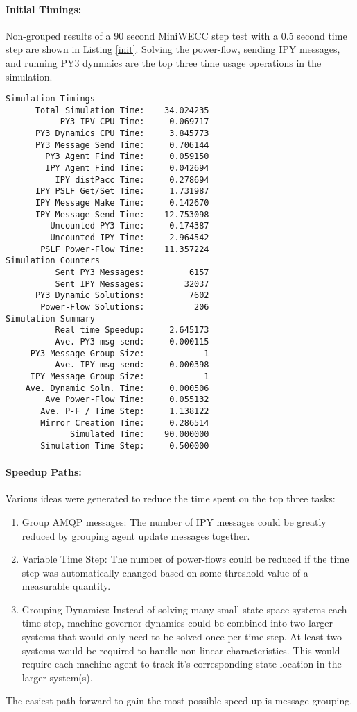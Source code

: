 \documentclass[12pt]{article}
\begin{document}
\begin{multicols}{2}
\raggedright
\paragraph{Initial Timings:} Non-grouped results of a 90 second MiniWECC step test with a 0.5 second time step are shown in Listing \ref{init}. Solving the power-flow, sending IPY messages, and running PY3 dynmaics are the top three time usage operations in the simulation. 
\begin{lstlisting}[caption=Initial timings and counters., label=init]
Simulation Timings
      Total Simulation Time:    34.024235
           PY3 IPV CPU Time:     0.069717
      PY3 Dynamics CPU Time:     3.845773
      PY3 Message Send Time:     0.706144
        PY3 Agent Find Time:     0.059150
        IPY Agent Find Time:     0.042694
          IPY distPacc Time:     0.278694
      IPY PSLF Get/Set Time:     1.731987
      IPY Message Make Time:     0.142670
      IPY Message Send Time:    12.753098
         Uncounted PY3 Time:     0.174387
         Uncounted IPY Time:     2.964542
       PSLF Power-Flow Time:    11.357224
Simulation Counters
          Sent PY3 Messages:         6157
          Sent IPY Messages:        32037
      PY3 Dynamic Solutions:         7602
       Power-Flow Solutions:          206
Simulation Summary
          Real time Speedup:     2.645173
          Ave. PY3 msg send:     0.000115
     PY3 Message Group Size:            1
          Ave. IPY msg send:     0.000398
     IPY Message Group Size:            1
    Ave. Dynamic Soln. Time:     0.000506
        Ave Power-Flow Time:     0.055132
       Ave. P-F / Time Step:     1.138122
       Mirror Creation Time:     0.286514
             Simulated Time:    90.000000
       Simulation Time Step:     0.500000
\end{lstlisting}
\vfill\null
\columnbreak

\paragraph{Speedup Paths:} Various ideas were generated to reduce the time spent on the top three tasks:
\begin{enumerate}
\item Group AMQP messages: The number of IPY messages could be greatly reduced by grouping agent update messages together.
\item Variable Time Step: The number of power-flows could be reduced if the time step was automatically changed based on some threshold value of a measurable quantity.
\item Grouping Dynamics: Instead of solving many small state-space systems each time step, machine governor dynamics could be combined into two larger systems that would only need to be solved once per time step. At least two systems would be required to handle non-linear characteristics. This would require each machine agent to track it's corresponding state location in the larger system(s).
\end{enumerate}
The easiest path forward to gain the most possible speed up is message grouping.

\end{multicols}
\end{document}
